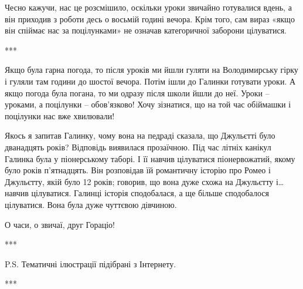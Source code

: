 Чесно кажучи, нас це розсмішило, оскільки уроки звичайно готувалися вдень, а
він приходив з роботи десь о восьмій годині вечора. Крім того, сам вираз «якщо
він спіймає нас за поцілунками» не означав категоричної заборони цілуватися.

***

Якщо була гарна погода, то після уроків ми йшли гуляти на Володимирську гірку і
гуляли там години до шостої вечора. Потім ішли до Галинки готувати уроки. А
якщо погода була погана, то ми одразу після школи йшли до неї. Уроки – уроками,
а поцілунки – обов’язково! Хочу зізнатися, що на той час обіймашки і поцілунки
нас вже хвилювали!  

Якось я запитав Галинку, чому вона на педраді сказала, що Джульєтті було
дванадцять років? Відповідь виявилася прозаїчною. Під час літніх канікул
Галинка була у піонерському таборі. І її навчив цілуватися піонервожатий, якому
було років п’ятнадцять. Він розповідав їй романтичну історію про Ромео і
Джульєтту, якій було 12 років; говорив, що вона дуже схожа на Джульєтту і…
навчив цілуватися. Галинці історія сподобалася, а ще більше сподобалося
цілуватися. Вона була дуже чуттєвою дівчиною.

О часи, о звичаї, друг Гораціо!

***

P.S. Тематичні ілюстрації підібрані з Інтернету.

***
